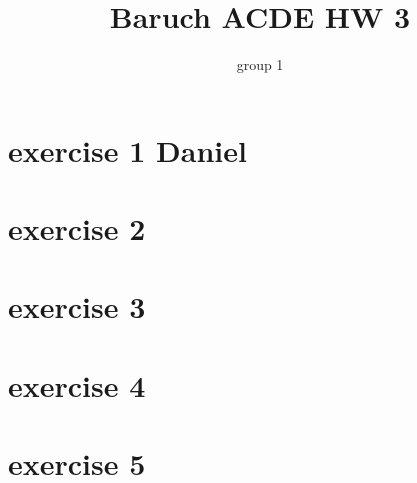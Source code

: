 \documentclass{article}
\title{Baruch ACDE HW 3}
\author{group 1}
\begin{document}
\maketitle
\tableofcontents

\section{exercise 1 Daniel}

\section{exercise 2}

\section{exercise 3}

\section{exercise 4}

\section{exercise 5}
\end{document}
